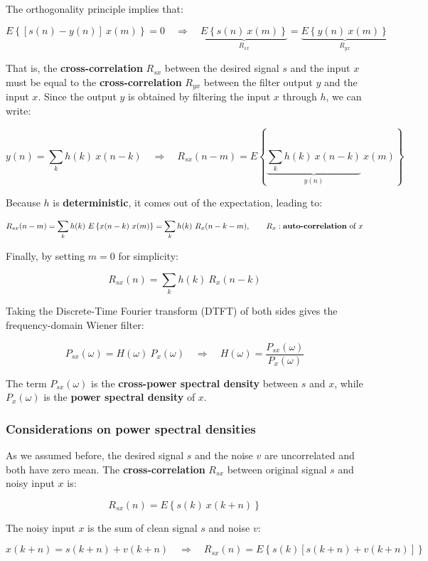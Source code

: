 The orthogonality principle implies that:

\[
E\left\{ \left[ s(n) - y(n) \right] \ x(m) \right\} = 0
\quad \Rightarrow \quad
\underbrace{E\left\{ s(n) \ x(m) \right\}}_{R_{sx}} = \underbrace{E\left\{ y(n) \ x(m) \right\}}_{R_{yx}}
\]

That is, the \textbf{cross-correlation} $R_{sx}$ between the desired signal $s$ and the input $x$ must be equal to the \textbf{cross-correlation} $R_{yx}$ between the filter output $y$ and the input $x$.
Since the output $y$ is obtained by filtering the input $x$ through $h$, we can write:

\[
y(n) = \sum_k h(k)\ x(n-k)
\quad \Rightarrow \quad
R_{sx}(n-m) = E\left\{ \underbrace{\sum_k h(k) \ x(n-k)}_{y(n)} \ x(m) \right\}
\]

Because $h$ is \textbf{deterministic}, it comes out of the expectation, leading to:

\[
R_{sx}(n-m) = \sum_k h(k) \ E\left\{ x(n-k) \ x(m) \right\}
= \sum_k h(k) \ R_x(n-k-m),
\qquad R_x: \text{\textbf{auto-correlation} of } x
\]

Finally, by setting $m=0$ for simplicity:

\[
R_{sx}(n) = \sum_k h(k) \ R_x(n-k)
\]

Taking the Discrete-Time Fourier transform (DTFT) of both sides gives the frequency-domain Wiener filter:

\[
P_{sx} (\omega) = H(\omega) \ P_x (\omega)
\quad \Rightarrow \quad
H(\omega) = \frac{P_{sx}(\omega)}{P_x(\omega)}
\]

The term $P_{sx}(\omega)$ is the \textbf{cross-power spectral density} between $s$ and $x$, while $P_x(\omega)$ is the \textbf{power spectral density} of $x$.

\subsubsection{Considerations on power spectral densities}

As we assumed before, the desired signal $s$ and the noise $v$ are uncorrelated and both have zero mean.  
The \textbf{cross-correlation} $R_{sx}$ between original signal $s$ and noisy input $x$ is:

\[
R_{sx}(n) = E \left\{ s(k) \ x(k+n) \right\}
\]

The noisy input $x$ is the sum of clean signal $s$ and noise $v$:

\[
x(k+n) = s(k+n) + v(k+n)
\quad \Rightarrow \quad
R_{sx}(n) = E \left\{ s(k) \left[ s(k+n) + v(k+n) \right] \right\}
\]

